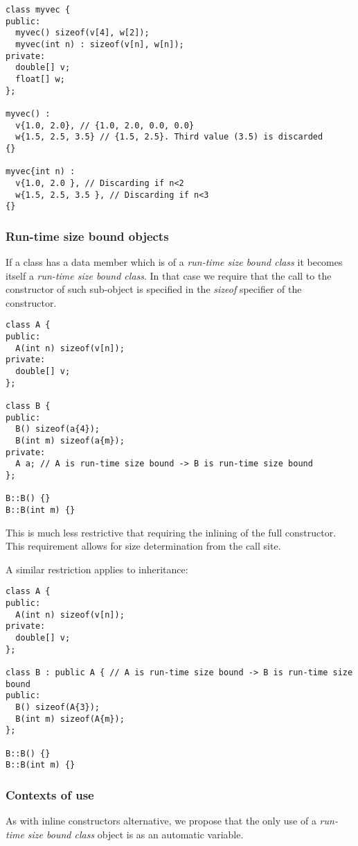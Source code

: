 \begin{lstlisting}
class myvec {
public:
  myvec() sizeof(v[4], w[2]);
  myvec(int n) : sizeof(v[n], w[n]);
private:
  double[] v;
  float[] w;
};

myvec() :
  v{1.0, 2.0}, // {1.0, 2.0, 0.0, 0.0}
  w{1.5, 2.5, 3.5} // {1.5, 2.5}. Third value (3.5) is discarded
{}

myvec{int n) :
  v{1.0, 2.0 }, // Discarding if n<2
  w{1.5, 2.5, 3.5 }, // Discarding if n<3
{}
\end{lstlisting}

\subsubsection{Run-time size bound objects}

If a class has a data member which is of a \emph{run-time size bound class} it
becomes itself a \emph{run-time size bound class}. In that case we require that
the call to the constructor of such sub-object is specified in the \emph{sizeof}
specifier of the constructor.

\begin{lstlisting}
class A {
public:
  A(int n) sizeof(v[n]);
private:
  double[] v;
};

class B {
public:
  B() sizeof(a{4});
  B(int m) sizeof(a{m});
private:
  A a; // A is run-time size bound -> B is run-time size bound
};

B::B() {}
B::B(int m) {}
\end{lstlisting}

This is much less restrictive that requiring the inlining of the full
constructor. This requirement allows for size determination from the call site.

A similar restriction applies to inheritance:

\begin{lstlisting}
class A {
public:
  A(int n) sizeof(v[n]);
private:
  double[] v;
};

class B : public A { // A is run-time size bound -> B is run-time size bound
public:
  B() sizeof(A{3});
  B(int m) sizeof(A{m});
};

B::B() {}
B::B(int m) {}
\end{lstlisting}

\subsubsection{Contexts of use}

As with inline constructors alternative, we propose that the only use of a
\emph{run-time size bound class} object is as an automatic variable.

